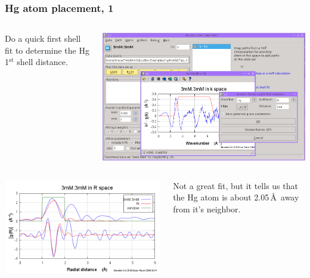 \documentclass[10pt, xcolor=x11names, compress]{beamer}
\begin{document}
\begin{frame}
  \frametitle{Hg atom placement, 1}
  \begin{columns}
    \begin{column}{0.35\linewidth}
      Do a quick first shell fit to determine the Hg 1$^{\mathrm{st}}$
      shell distance.
    \end{column}
    \begin{column}{0.65\linewidth}
      \includegraphics[width=\linewidth]{images/qfs.png}
    \end{column}
  \end{columns}

  \begin{columns}
    \begin{column}{0.5\linewidth}
      \includegraphics[width=\linewidth]{images/qfs_fit.png}      
    \end{column}
    \begin{column}{0.5\linewidth}
      Not a great fit, but it tells us that the Hg atom is about
      2.05\,\AA\ away from it's neighbor.
    \end{column}
  \end{columns}
\end{frame}
\end{document}
